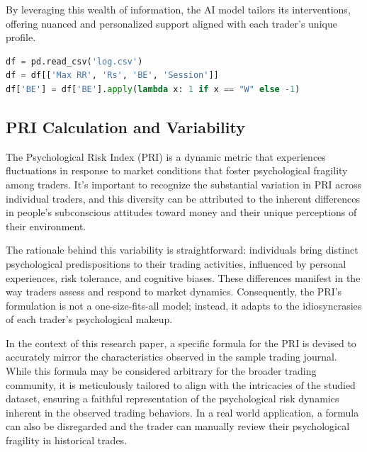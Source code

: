 \documentclass{article}
\begin{document}
By leveraging this wealth of information, the AI model tailors its interventions, offering nuanced and personalized support aligned with each trader's unique profile.

\begin{lstlisting}[language=Python, caption={Selecting Columns from Journal}, label={lst:python}]
df = pd.read_csv('log.csv')
df = df[['Max RR', 'Rs', 'BE', 'Session']]
df['BE'] = df['BE'].apply(lambda x: 1 if x == "W" else -1)
\end{lstlisting}

\subsection{PRI Calculation and Variability}
The Psychological Risk Index (PRI) is a dynamic metric that experiences fluctuations in response to market conditions that foster psychological fragility among traders. It's important to recognize the substantial variation in PRI across individual traders, and this diversity can be attributed to the inherent differences in people's subconscious attitudes toward money and their unique perceptions of their environment.

The rationale behind this variability is straightforward: individuals bring distinct psychological predispositions to their trading activities, influenced by personal experiences, risk tolerance, and cognitive biases. These differences manifest in the way traders assess and respond to market dynamics. Consequently, the PRI's formulation is not a one-size-fits-all model; instead, it adapts to the idiosyncrasies of each trader's psychological makeup.

In the context of this research paper, a specific formula for the PRI is devised to accurately mirror the characteristics observed in the sample trading journal. While this formula may be considered arbitrary for the broader trading community, it is meticulously tailored to align with the intricacies of the studied dataset, ensuring a faithful representation of the psychological risk dynamics inherent in the observed trading behaviors. In a real world application, a formula can also be disregarded and the trader can manually review their psychological fragility in historical trades.
\end{document}
